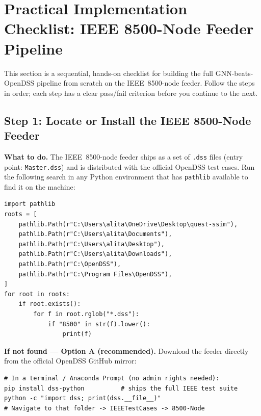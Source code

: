 \documentclass[11pt]{article}
\begin{document}
\section{Practical Implementation Checklist: IEEE 8500-Node Feeder Pipeline}
\label{sec:checklist}

This section is a sequential, hands-on checklist for building the full
GNN-beats-OpenDSS pipeline from scratch on the IEEE~8500-node feeder.
Follow the steps in order; each step has a clear pass/fail criterion before
you continue to the next.

\subsection{Step 1: Locate or Install the IEEE 8500-Node Feeder}
\label{subsec:step1}

\noindent\textbf{What to do.}
The IEEE~8500-node feeder ships as a set of \texttt{.dss} files
(entry point: \texttt{Master.dss}) and is distributed with the official
OpenDSS test cases.  Run the following search in any Python environment that
has \texttt{pathlib} available to find it on the machine:

\begin{verbatim}
import pathlib
roots = [
    pathlib.Path(r"C:\Users\alita\OneDrive\Desktop\quest-ssim"),
    pathlib.Path(r"C:\Users\alita\Documents"),
    pathlib.Path(r"C:\Users\alita\Desktop"),
    pathlib.Path(r"C:\Users\alita\Downloads"),
    pathlib.Path(r"C:\OpenDSS"),
    pathlib.Path(r"C:\Program Files\OpenDSS"),
]
for root in roots:
    if root.exists():
        for f in root.rglob("*.dss"):
            if "8500" in str(f).lower():
                print(f)
\end{verbatim}

\noindent\textbf{If not found --- Option A (recommended).}
Download the feeder directly from the official OpenDSS GitHub mirror:

\begin{verbatim}
# In a terminal / Anaconda Prompt (no admin rights needed):
pip install dss-python          # ships the full IEEE test suite
python -c "import dss; print(dss.__file__)"
# Navigate to that folder -> IEEETestCases -> 8500-Node
\end{verbatim}
\end{document}
